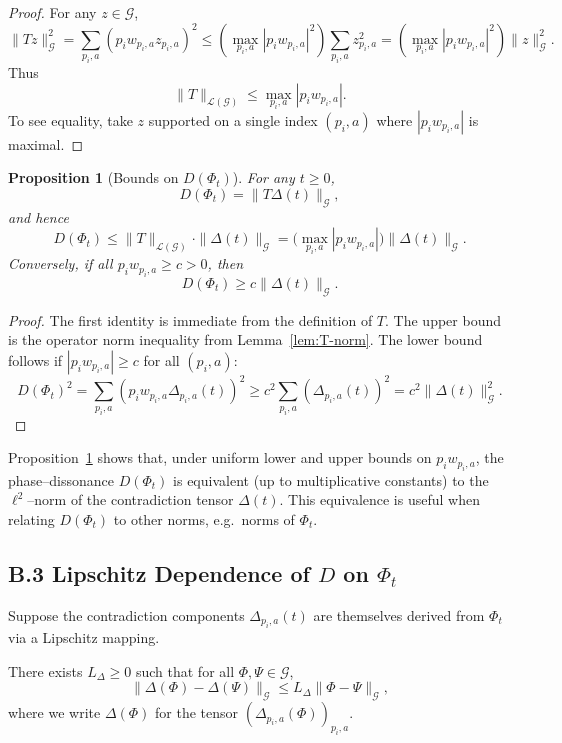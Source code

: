 \documentclass[11pt]{article}
\newtheorem{proposition}[theorem]{Proposition}
\begin{document}
\begin{proof}
For any $z \in \mathcal{G}$,
\[
  \|Tz\|_{\mathcal{G}}^2
  =
  \sum_{p_i,a} (p_i w_{p_i,a} z_{p_i,a})^2
  \le
  \left( \max_{p_i,a} |p_i w_{p_i,a}|^2 \right)
  \sum_{p_i,a} z_{p_i,a}^2
  =
  \left( \max_{p_i,a} |p_i w_{p_i,a}|^2 \right)
  \|z\|_{\mathcal{G}}^2.
\]
Thus
\[
  \|T\|_{\mathcal{L}(\mathcal{G})} \le \max_{p_i,a} |p_i w_{p_i,a}|.
\]
To see equality, take $z$ supported on a single index $(p_i,a)$ where $|p_i w_{p_i,a}|$ is maximal.
\end{proof}

\begin{proposition}[Bounds on $D(\Phi_t)$]\label{prop:D-bounds}
For any $t \ge 0$,
\[
  D(\Phi_t) = \|T \Delta(t)\|_{\mathcal{G}},
\]
and hence
\[
  D(\Phi_t)
  \le
  \|T\|_{\mathcal{L}(\mathcal{G})} \cdot \|\Delta(t)\|_{\mathcal{G}}
  =
  \Big(\max_{p_i,a} |p_i w_{p_i,a}|\Big) \|\Delta(t)\|_{\mathcal{G}}.
\]
Conversely, if all $p_i w_{p_i,a} \ge c > 0$, then
\[
  D(\Phi_t)
  \ge
  c \|\Delta(t)\|_{\mathcal{G}}.
\]
\end{proposition}

\begin{proof}
The first identity is immediate from the definition of $T$. The upper bound is the operator norm inequality from Lemma~\ref{lem:T-norm}. The lower bound follows if $|p_i w_{p_i,a}| \ge c$ for all $(p_i,a)$:
\[
  D(\Phi_t)^2
  =
  \sum_{p_i,a} (p_i w_{p_i,a} \Delta_{p_i,a}(t))^2
  \ge
  c^2 \sum_{p_i,a} (\Delta_{p_i,a}(t))^2
  =
  c^2 \|\Delta(t)\|_{\mathcal{G}}^2.
\]
\end{proof}

Proposition~\ref{prop:D-bounds} shows that, under uniform lower and upper bounds on $p_i w_{p_i,a}$, the phase--dissonance $D(\Phi_t)$ is equivalent (up to multiplicative constants) to the $\ell^2$--norm of the contradiction tensor $\Delta(t)$. This equivalence is useful when relating $D(\Phi_t)$ to other norms, e.g.\ norms of $\Phi_t$.

\subsection{B.3 Lipschitz Dependence of $D$ on $\Phi_t$}

Suppose the contradiction components $\Delta_{p_i,a}(t)$ are themselves derived from $\Phi_t$ via a Lipschitz mapping.

\begin{assumption}\label{ass:Delta-Lipschitz}
There exists $L_\Delta \ge 0$ such that for all $\Phi,\Psi \in \mathcal{G}$,
\[
  \|\Delta(\Phi) - \Delta(\Psi)\|_{\mathcal{G}}
  \le L_\Delta \|\Phi - \Psi\|_{\mathcal{G}},
\]
where we write $\Delta(\Phi)$ for the tensor $(\Delta_{p_i,a}(\Phi))_{p_i,a}$.
\end{assumption}
\end{document}
